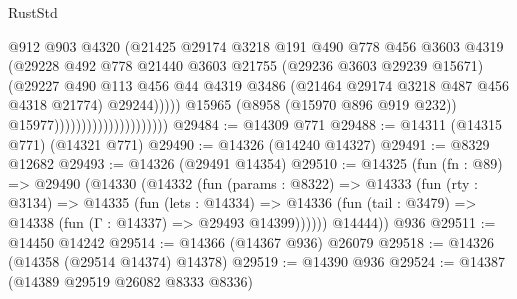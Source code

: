 \begin{lexlean}{RustStd}
\begin{coremodule}
                                                  @912
                                                  @903
                                                  @4320
                                                  (@21425
                                                    @29174
                                                    @3218
                                                    @191
                                                    @490
                                                    @778
                                                    @456
                                                    @3603
                                                    @4319
                                                    (@29228
                                                      @492
                                                      @778
                                                      @21440
                                                      @3603
                                                      @21755
                                                      (@29236 @3603 @29239 @15671)
                                                      (@29227
                                                        @490
                                                        @113
                                                        @456
                                                        @44
                                                        @4319
                                                        @3486
                                                        (@21464 @29174 @3218 @487 @456 @4318 @21774)
                                                        @29244)))))
                                              @15965
                                              (@8958 (@15970 @896 @919 @232))
                                              @15977)))))))))))))))))))))
@29484 := @14309 @771
@29488 := @14311 (@14315 @771) (@14321 @771)
@29490 := @14326 (@14240 @14327)
@29491 := @8329 @12682
@29493 := @14326 (@29491 @14354)
@29510 := @14325
    (fun (fn : @89) =>
    @29490
      (@14330
        (@14332
          (fun (params : @8322) =>
          @14333
            (fun (rty : @3134) =>
            @14335
              (fun (lets : @14334) =>
              @14336 (fun (tail : @3479) => @14338 (fun (Γ : @14337) => @29493 @14399))))))
        @14444))
    @936
@29511 := @14450 @14242
@29514 := @14366 (@14367 @936) @26079
@29518 := @14326 (@14358 (@29514 @14374) @14378)
@29519 := @14390 @936
@29524 := @14387 (@14389 @29519 @26082 @8333 @8336)

\end{coremodule}
\end{lexlean}
